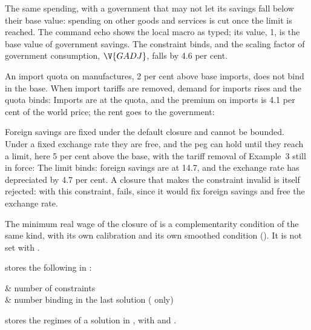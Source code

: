 
The same spending, with a government that may not let its savings fall below
their base value: spending on other goods and services is cut once the limit
is reached.
The command echo shows the local macro as typed; its value, 1, is the base
value of government savings. The constraint binds, and the scaling factor of
government consumption, $\V{GADJ}$, falls by 4.6 per cent.


An import quota on manufactures, 2 per cent above base imports, does not bind
in the base. When import tariffs are removed, demand for imports rises and the
quota binds:
Imports are at the quota, and the premium on imports is 4.1 per cent of the
world price; the rent goes to the government:


Foreign savings are fixed under the default closure and cannot be bounded. Under
a fixed exchange rate they are free, and the peg can hold until they reach a
limit, here 5 per cent above the base, with the tariff removal of Example~3
still in force:
The limit binds: foreign savings are at 14.7, and the exchange rate has
depreciated by 4.7 per cent. A closure that makes the constraint invalid is
itself rejected: with this constraint, 
fails, since it would fix foreign savings and free the exchange rate.


The minimum real wage of the closure  of  is
a complementarity condition of the same kind, with its own calibration and its
own smoothed condition (). It is not set with
.


 stores the following in :
\begin{storedres}
 & number of constraints\\
 & number binding in the last solution ( only)\\
\end{storedres}
 stores the regimes of a solution in ,
with  and .

